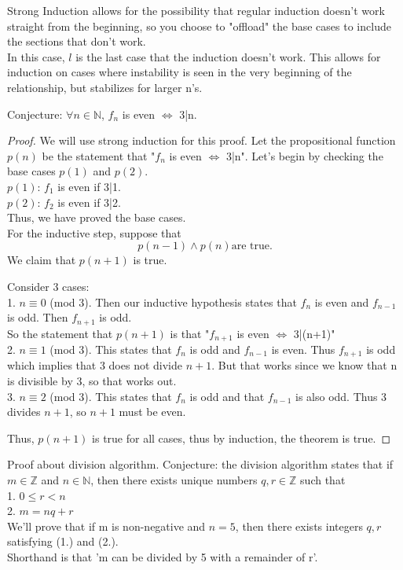 \documentclass{article}
\begin{document}
Strong Induction allows for the possibility that regular induction doesn't work straight from the beginning, so you choose to "offload" the base cases to include the sections that don't work. \\
In this case, $l$ is the last case that the induction doesn't work. This allows for induction on cases where instability is seen in the very beginning of the relationship, but stabilizes for larger n's.

\begin{center}
    Conjecture: $\forall n \in \mathbb{N}$, $f_n$ is even $\iff$ 3|n. 
\end{center}

\begin{proof}
    We will use strong induction for this proof. Let the propositional function $p(n)$ be the statement that "$f_n$ is even $\iff$ 3|n". 
    Let's begin by checking the base cases $p(1)$ and $p(2)$. \\
    $p(1)$: $f_1$ is even if 3|1.\\ 
    $p(2)$: $f_2$ is even if 3|2.\\
    Thus, we have proved the base cases. \\
    For the inductive step, suppose that 
    \begin{equation}
        p(n-1) \land p(n) \textrm{are true.}
    \end{equation}
    We claim that $p(n+1)$ is true. \\
    \begin{center}
        Consider 3 cases:\\
        1. $n \equiv 0$ (mod 3). Then our inductive hypothesis states that $f_n$ is even and $f_{n-1}$ is odd. Then $f_{n+1}$ is odd. \\
        So the statement that $p(n+1)$ is that "$f_{n+1}$ is even $\iff$ 3|(n+1)" \\
        2. $n \equiv 1$ (mod 3). This states that $f_n$ is odd and $f_{n-1}$ is even. Thus $f_{n+1}$ is odd which implies that 3 does not divide $n+1$. But that works since we know that n is divisible by 3, so that works out. \\
        3. $n \equiv 2$ (mod 3). This states that $f_n$ is odd and that $f_{n-1}$ is also odd. Thus 3 divides $n+1$, so $n+1$ must be even. 
    \end{center}
    Thus, $p(n+1)$ is true for all cases, thus by induction, the theorem is true. 
\end{proof}

Proof about division algorithm. Conjecture: the division algorithm states that if $m \in \mathbb{Z}$ and $n \in \mathbb{N}$, then there exists unique numbers $q,r \in \mathbb{Z}$ such that \\
1. $0 \leq r < n$ \\
2. $m = nq + r$ \\
We'll prove that if m is non-negative and $n=5$, then there exists integers $q,r$ satisfying (1.) and (2.). \\
Shorthand is that 'm can be divided by 5 with a remainder of r'.
\end{document}

